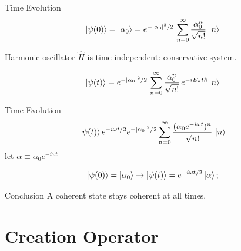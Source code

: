 \documentclass{loyola-beamer}
\begin{document}
\begin{frame}{Time Evolution}
    \begin{align*}
        \ket{\psi(0)} = \ket{\alpha_0} = e^{-|\alpha_0|^2/2}\,
        \sum_{n=0}^\infty \frac{\alpha_0^n}{\sqrt{n!}} \, \ket{n}
    \end{align*}

    \begin{block}{Harmonic oscillator}
        $\hat{H}$ is time independent: conservative system.
    \end{block}


    \begin{align*}
        \ket{\psi(t)} = e^{-|\alpha_0|^2/2}\,
        \sum_{n=0}^\infty \frac{\alpha_0^n}{\sqrt{n!}} \,  e^{-iE_nt\hbar} \ket{n}
    \end{align*}
\end{frame}

\begin{frame}{Time Evolution}
    \begin{align*}
        \ket{\psi(t)} e^{-i\omega t/2} e^{-|\alpha_0|^2 /2}
        \sum_{n=0}^\infty \frac{(\alpha_0 e^{-i\omega t})^n}{\sqrt{n!}}\, \ket{n}
    \end{align*}
    let $\alpha \equiv \alpha_0 e^{-i\omega t}$

    \begin{align*}
        \ket{\psi(0)} = \ket{\alpha_0} \rightarrow \ket{\psi(t)} = e^{-i\omega t/2} \ket{\alpha};
    \end{align*}

    \begin{block}{Conclusion}
        A coherent state stays coherent at all times.
    \end{block}
\end{frame}


\section{Creation Operator}
\end{document}
